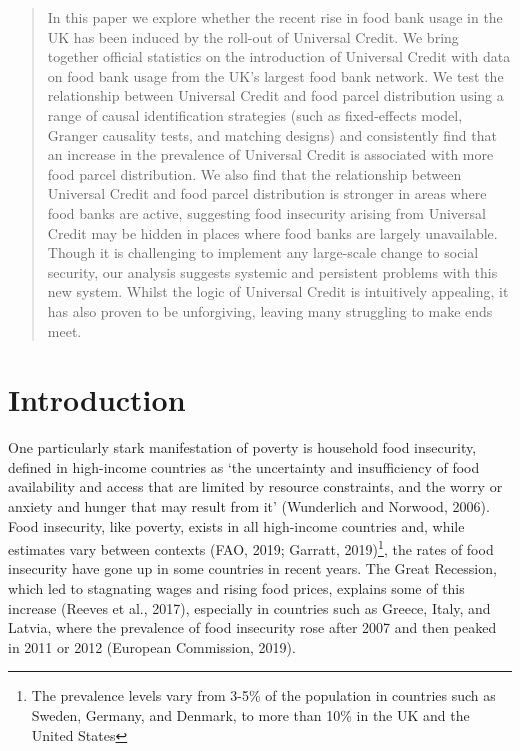\documentclass[12pt,article,oneside]{memoir}
\begin{document}
\begin{abstract}
\newline In this paper we explore whether the recent rise in food bank usage in the UK has been induced by the roll-out of Universal Credit. We bring together official statistics on the introduction of Universal Credit with data on food bank usage from the UK’s largest food bank network. We test the relationship between Universal Credit and food parcel distribution using a range of causal identification strategies (such as fixed-effects model, Granger causality tests, and matching designs) and consistently find that an increase in the prevalence of Universal Credit is associated with more food parcel distribution. We also find that the relationship between Universal Credit and food parcel distribution is stronger in areas where food banks are active, suggesting food insecurity arising from Universal Credit may be hidden in places where food banks are largely unavailable. Though it is challenging to implement any large-scale change to social security, our analysis suggests systemic and persistent problems with this new system. Whilst the logic of Universal Credit is intuitively appealing, it has also proven to be unforgiving, leaving many struggling to make ends meet. 

\end{abstract} 

\section*{Introduction}

One particularly stark manifestation of poverty is household food insecurity, defined in high-income countries as ‘the uncertainty and insufficiency of food availability and access that are limited by resource constraints, and the worry or anxiety and hunger that may result from it’ (Wunderlich and Norwood, 2006). Food insecurity, like poverty, exists in all high-income countries and, while estimates vary between contexts (FAO, 2019; Garratt, 2019)\footnote{The prevalence levels vary from 3-5\% of the population in countries such as Sweden, Germany, and Denmark, to more than 10\% in the UK and the United States}, the rates of food insecurity have gone up in some countries in recent years. The Great Recession, which led to stagnating wages and rising food prices, explains some of this increase (Reeves et al., 2017), especially in countries such as Greece, Italy, and Latvia, where the prevalence of food insecurity rose after 2007 and then peaked in 2011 or 2012 (European Commission, 2019).
\end{document}
